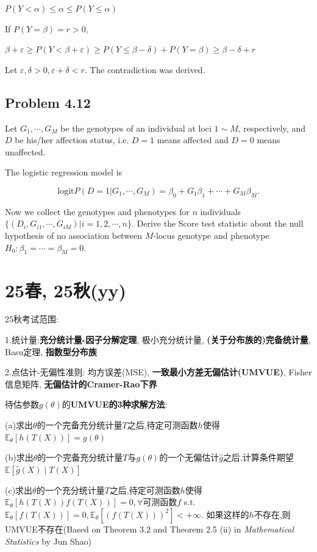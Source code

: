 $P(Y<\alpha)\leq \alpha \leq P(Y\leq \alpha)$

If $P(Y=\beta)=r>0,$

$ \beta+\varepsilon\geq P(Y<\beta+\varepsilon)\geq P(Y\leq \beta-\delta)+P(Y=\beta)\geq \beta-\delta+r$

Let $\varepsilon,\delta>0,\varepsilon+\delta<r$. The contradiction was derived.

\subsection*{Problem 4.12}  

Let \( G_1, \cdots, G_M \) be the genotypes of an individual at loci \( 1 \sim M \), respectively, and \( D \) be his/her affection status, i.e. \( D = 1 \) means affected and \( D = 0 \) means unaffected.  

The logistic regression model is  

\[\mathrm{logit} P(D = 1|G_1, \cdots, G_M) = \beta_0 + G_1\beta_1 + \cdots + G_M\beta_M.\]  

Now we collect the genotypes and phenotypes for \( n \) individuals \(\{(D_i, G_{i1}, \cdots, G_{iM}) | i = 1, 2, \cdots, n\}\). Derive the Score test statistic about the null hypothesis of no association between \( M \)-locus genotype and phenotype \( H_0: \beta_1 = \cdots = \beta_M = 0\).

\section*{25春, 25秋(yy)}

25秋考试范围:

1.统计量:\textbf{充分统计量-因子分解定理}, 极小充分统计量, \textbf{(关于分布族的)完备统计量}, Basu定理, \textbf{指数型分布族}

2.点估计-无偏性准则: 均方误差(MSE), \textbf{一致最小方差无偏估计(UMVUE)}, Fisher信息矩阵, \textbf{无偏估计的Cramer-Rao下界}

待估参数$g(\theta)$的\textbf{UMVUE的3种求解方法}:

(a)求出$\theta$的一个完备充分统计量$T$之后,待定可测函数$h$使得$\mathbb{E}_{\theta}[h(T(X))]=g(\theta)$

(b)求出$\theta$的一个完备充分统计量$T$与$g(\theta)$的一个无偏估计$\hat{g}$之后,计算条件期望$\mathbb{E}[\hat{g}(X)\mid T(X)]$

(c)求出$\theta$的一个充分统计量$T$之后,待定可测函数$h$使得$\mathbb{E}_{\theta}[h(T(X))f(T(X))]=0,\forall$可测函数$f$ s.t. $\mathbb{E}_{\theta}[f(T(X))]=0,\mathbb{E}_{\theta}[(f(T(X)))^2]<+\infty$.
如果这样的$h$不存在,则UMVUE不存在(Based on Theorem 3.2 and Theorem 2.5 (ii) in \textit{Mathematical Statistics} by Jun Shao)


